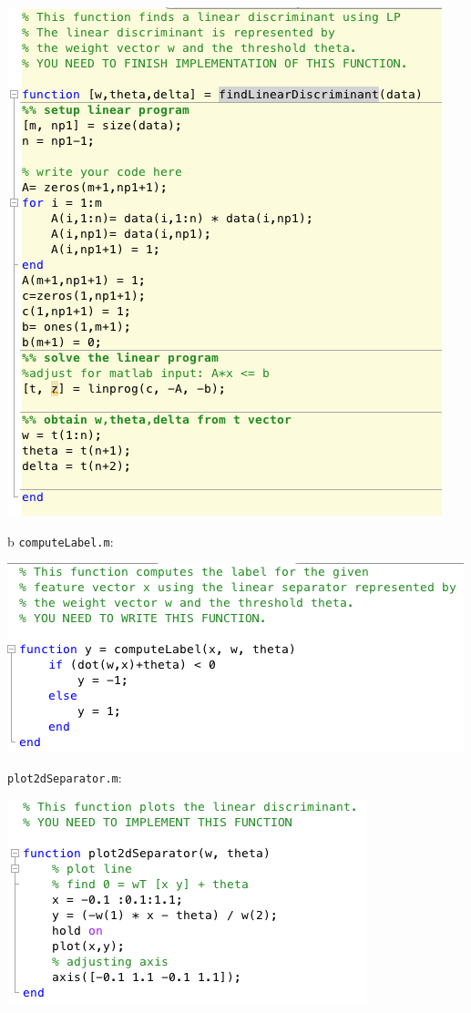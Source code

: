 \begin{enumerate}
\begin{center}
	\includegraphics[scale= 0.8]{fig5}
\end{center}b
\clearpage
{\tt computeLabel.m}:\\
\begin{center}
	\includegraphics[scale= 0.8]{fig6}
\end{center}
{\tt plot2dSeparator.m}:\\
\begin{center}
	\includegraphics[scale= 0.8]{fig7}

\end{center}
\end{enumerate}
